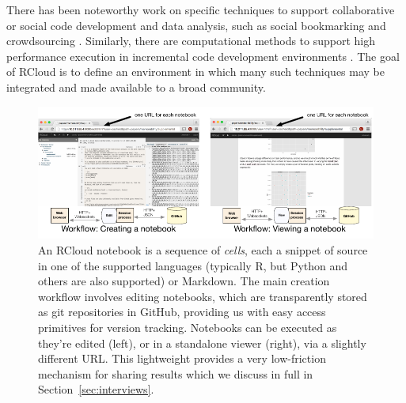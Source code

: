 There has been noteworthy work on specific techniques
to support collaborative or social code development and data analysis,
such as social bookmarking \cite{Millen:2006:DSB} \cite{Heer:2007:VAV}
and crowdsourcing \cite{Fast:2014:ECS}.
Similarly, there are computational methods to support high
performance execution in incremental code development
environments \cite{Guo:2010:TPI}.
The goal of RCloud is to define an environment in which many such
techniques may be integrated and made available to a broad community.
\begin{figure}
\centering
\includegraphics[width=.95\linewidth]{fig/notebook/notebook.pdf}
\caption{\label{fig:notebook}An RCloud notebook is a sequence of
\emph{cells}, each a snippet of source in one of the supported languages (typically R, but Python and others are also supported) or Markdown. The main creation workflow involves editing notebooks, which are transparently stored as git repositories in GitHub, providing us with easy access primitives for version tracking. Notebooks can be executed as they're edited (left), or in a standalone viewer (right), via a slightly different URL. This lightweight provides a very low-friction mechanism for sharing results which we discuss in full in Section~\ref{sec:interviews}. }
\end{figure}


